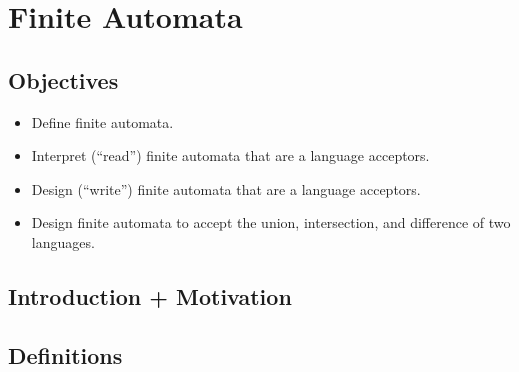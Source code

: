 \chapter{Finite Automata}

\section{Objectives}

\begin{itemize}
	\item Define finite automata.
	\item Interpret (``read'') finite automata that are a language acceptors.
	\item Design (``write'') finite automata that are a language acceptors.
	\item Design finite automata to accept the union, intersection, and difference of two languages.
\end{itemize}

\section{Introduction + Motivation}

\section{Definitions}

